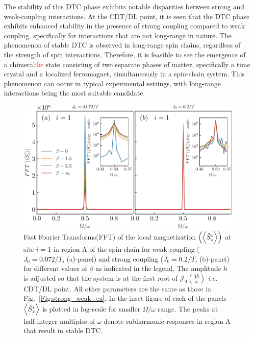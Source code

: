 \documentclass[12pt]{iopart}
\newcommand{\red}[1]{\textcolor{red}{#1}}
\begin{document}
The stability of this DTC phase exhibits notable disparities between strong and weak-coupling interactions. At the CDT/DL point, it is seen that the DTC phase exhibits enhanced stability in the presence of strong coupling compared to weak coupling, specifically for interactions that are not long-range in nature. The phenomenon of stable DTC is observed in long-range spin chains, regardless of the strength of spin interactions. Therefore, it is feasible to see the emergence of a chimera\red{like} state consisting of two separate phases of matter, specifically a time crystal and a localized ferromagnet, simultaneously in a spin-chain system. This phenomenon can occur in typical experimental settings, with long-range interactions being the most suitable candidate.

\begin{figure}[h]
	\centering
	\includegraphics[width=10.cm]{figure5.pdf}
	\caption{Fast Fourier Transforms(FFT) of the local magnetization $\left(\expval{\hat{S}_z^i}\right)$ at site $i=1$ in region A of the spin-chain for weak coupling ($J_0 = 0.072/T$, (a)-panel) and strong coupling ($J_0 = 0.2/T$, (b)-panel) for different values of $\beta$ as indicated in the legend. The amplitude $h$ is adjusted so that the system is at the first root of $\mathcal{J}_0\left(\frac{4h}{\omega}\right)$ \textit{i.e.} CDT/DL point. All other parameters are the same as those in Fig.~\ref{Fig:strong_weak_ea}. In the inset figure of each of the panels $\expval{\hat{S}_z^i}$ is plotted in log-scale for smaller $\Omega/\omega$ range. The peaks at half-integer multiples of $\omega$ denote subharmonic responses in region A that result in stable DTC.}
	\label{Fig:sz_single}
\end{figure}
\end{document}
